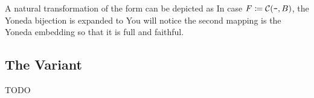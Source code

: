 A natural transformation of the form
can be depicted as
In case $F \coloneqq \mathcal{C}(\texttt{-},B)$, the Yoneda bijection is expanded to
You will notice the second mapping is the Yoneda embedding so that %
it is full and faithful.

\subsection{The Variant}
TODO 

